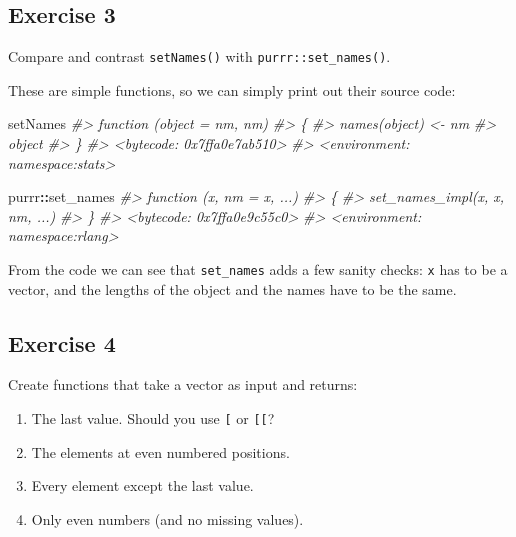 \documentclass[]{book}
\newenvironment{Shaded}{\begin{snugshade}}{\end{snugshade}}
\newcommand{\CommentTok}[1]{\textcolor[rgb]{0.56,0.35,0.01}{\textit{#1}}}
\newcommand{\NormalTok}[1]{#1}
\newcommand{\OperatorTok}[1]{\textcolor[rgb]{0.81,0.36,0.00}{\textbf{#1}}}
\providecommand{\tightlist}{%
  \setlength{\itemsep}{0pt}\setlength{\parskip}{0pt}}
\theoremstyle{plain}
\theoremstyle{remark}
\theoremstyle{definition}
\theoremstyle{definition}
\theoremstyle{definition}
\theoremstyle{remark}
\begin{document}
\hypertarget{exercise-3-42}{%
\subsection{Exercise 3}\label{exercise-3-42}}

Compare and contrast \texttt{setNames()} with
\texttt{purrr::set\_names()}.

These are simple functions, so we can simply print out their source
code:

\begin{Shaded}
\begin{Highlighting}[]
\NormalTok{setNames}
\CommentTok{#> function (object = nm, nm) }
\CommentTok{#> \{}
\CommentTok{#>     names(object) <- nm}
\CommentTok{#>     object}
\CommentTok{#> \}}
\CommentTok{#> <bytecode: 0x7ffa0e7ab510>}
\CommentTok{#> <environment: namespace:stats>}
\end{Highlighting}
\end{Shaded}

\begin{Shaded}
\begin{Highlighting}[]
\NormalTok{purrr}\OperatorTok{::}\NormalTok{set_names}
\CommentTok{#> function (x, nm = x, ...) }
\CommentTok{#> \{}
\CommentTok{#>     set_names_impl(x, x, nm, ...)}
\CommentTok{#> \}}
\CommentTok{#> <bytecode: 0x7ffa0e9c55c0>}
\CommentTok{#> <environment: namespace:rlang>}
\end{Highlighting}
\end{Shaded}

From the code we can see that \texttt{set\_names} adds a few sanity
checks: \texttt{x} has to be a vector, and the lengths of the object and
the names have to be the same.

\hypertarget{exercise-4-31}{%
\subsection{Exercise 4}\label{exercise-4-31}}

Create functions that take a vector as input and returns:

\begin{enumerate}
\def\labelenumi{\arabic{enumi}.}
\tightlist
\item
  The last value. Should you use \texttt{{[}} or \texttt{{[}{[}}?
\item
  The elements at even numbered positions.
\item
  Every element except the last value.
\item
  Only even numbers (and no missing values).
\end{enumerate}
\end{document}
